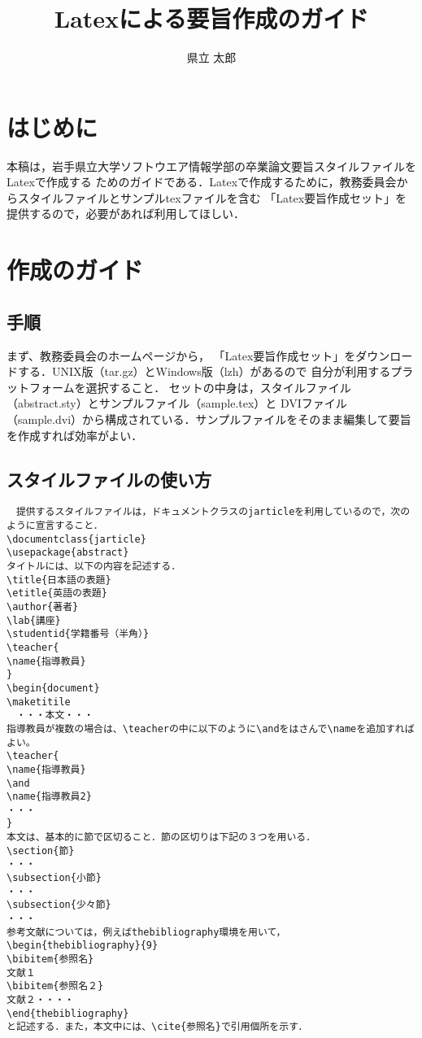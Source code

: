 \documentclass[twocolumn,a4paper]{jarticle}
\title{Latexによる要旨作成のガイド}
\author{県立 太郎}
\begin{document}
\maketitle
\section{はじめに}
本稿は，岩手県立大学ソフトウエア情報学部の卒業論文要旨スタイルファイルをLatex\cite{bibunsho}で作成する
ためのガイドである．Latexで作成するために，教務委員会からスタイルファイルとサンプルtexファイルを含む
「Latex要旨作成セット」を提供するので，必要があれば利用してほしい．
\section{作成のガイド}
\subsection{手順}
まず、教務委員会のホームページから，
「Latex要旨作成セット」をダウンロードする．UNIX版（tar.gz）とWindows版（lzh）があるので
自分が利用するプラットフォームを選択すること．
セットの中身は，スタイルファイル（abstract.sty）とサンプルファイル（sample.tex）と
DVIファイル（sample.dvi）から構成されている．サンプルファイルをそのまま編集して要旨を作成すれば効率がよい．
\subsection{スタイルファイルの使い方}
\begin{verbatim}
　提供するスタイルファイルは，ドキュメントクラスのjarticleを利用しているので，次のように宣言すること．
\documentclass{jarticle}
\usepackage{abstract}
タイトルには、以下の内容を記述する．
\title{日本語の表題}
\etitle{英語の表題}
\author{著者}
\lab{講座}
\studentid{学籍番号（半角）}
\teacher{
\name{指導教員}
}
\begin{document}
\maketitile
　・・・本文・・・
指導教員が複数の場合は、\teacherの中に以下のように\andをはさんで\nameを追加すればよい。
\teacher{
\name{指導教員}
\and
\name{指導教員2}
・・・
}
本文は、基本的に節で区切ること．節の区切りは下記の３つを用いる．
\section{節}
・・・
\subsection{小節}
・・・
\subsection{少々節}
・・・
参考文献については，例えばthebibliography環境を用いて，
\begin{thebibliography}{9}
\bibitem{参照名}
文献１
\bibitem{参照名２}
文献２・・・・
\end{thebibliography}
と記述する．また，本文中には、\cite{参照名}で引用個所を示す．
\end{verbatim}
\end{document}
